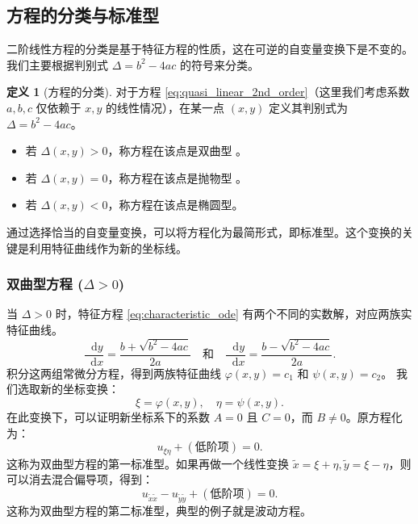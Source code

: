 \documentclass[12pt,a4paper]{article}
\newcommand{\diff}{\mathop{}\!\mathrm{d}}
\numberwithin{subsection}{section}
\numberwithin{subsubsection}{subsection}
\theoremstyle{plain}
\theoremstyle{definition}
\newtheorem{definition}[theorem]{定义}
\theoremstyle{remark}
\begin{document}
	
	\subsection{方程的分类与标准型}
	二阶线性方程的分类是基于特征方程的性质，这在可逆的自变量变换下是不变的。我们主要根据判别式 \(\Delta = b^2 - 4ac\) 的符号来分类。
	\begin{definition}[方程的分类]
		对于方程 \eqref{eq:quasi_linear_2nd_order}（这里我们考虑系数 \(a,b,c\) 仅依赖于 \(x,y\) 的线性情况），在某一点 \((x,y)\) 定义其判别式为 \(\Delta = b^2 - 4ac\)。
		\begin{itemize}
			\item 若 \(\Delta(x,y) > 0\)，称方程在该点是双曲型 。
			\item 若 \(\Delta(x,y) = 0\)，称方程在该点是抛物型 。
			\item 若 \(\Delta(x,y) < 0\)，称方程在该点是椭圆型。
		\end{itemize}
	\end{definition}
	通过选择恰当的自变量变换，可以将方程化为最简形式，即标准型。这个变换的关键是利用特征曲线作为新的坐标线。
	
	\subsubsection{双曲型方程 (\texorpdfstring{$\Delta > 0$}{Delta > 0})}
	当 \(\Delta > 0\) 时，特征方程 \eqref{eq:characteristic_ode} 有两个不同的实数解，对应两族实特征曲线。
	\[
	\frac{\diff y}{\diff x} = \frac{b + \sqrt{b^2-4ac}}{2a} \quad \text{和} \quad \frac{\diff y}{\diff x} = \frac{b - \sqrt{b^2-4ac}}{2a}.
	\]
	积分这两组常微分方程，得到两族特征曲线 \(\varphi(x,y) = c_1\) 和 \(\psi(x,y) = c_2\)。
	我们选取新的坐标变换：
	\[
	\xi = \varphi(x,y), \quad \eta = \psi(x,y).
	\]
	在此变换下，可以证明新坐标系下的系数 \(A=0\) 且 \(C=0\)，而 \(B \neq 0\)。原方程化为：
	\begin{equation}\label{eq:hyperbolic_canonical_1}
		u_{\xi\eta} + (\text{低阶项}) = 0.
	\end{equation}
	这称为双曲型方程的第一标准型。如果再做一个线性变换 \(\tilde{x} = \xi+\eta, \tilde{y}=\xi-\eta\)，则可以消去混合偏导项，得到：
	\begin{equation}\label{eq:hyperbolic_canonical_2}
		u_{\tilde{x}\tilde{x}} - u_{\tilde{y}\tilde{y}} + (\text{低阶项}) = 0.
	\end{equation}
	这称为双曲型方程的第二标准型，典型的例子就是波动方程。
	
\end{document}
